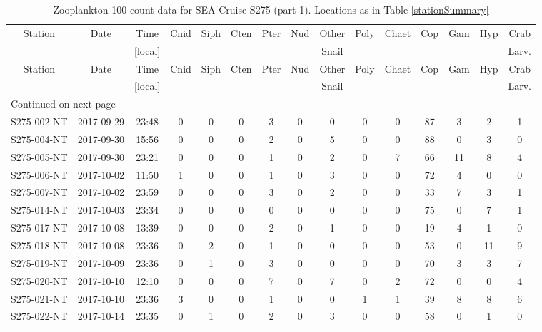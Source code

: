 \begin{longtable}{ccccccccccccccc}
\caption{\label{100count1} Zooplankton 100 count data for SEA Cruise S275 (part 1). Locations as in Table \ref{stationSummary}} \\ 
 Station & Date & Time & Cnid & Siph & Cten & Pter & Nud & Other & Poly & Chaet & Cop & Gam & Hyp & Crab \\ 
   &  & [local] &  &  &  &  &  & Snail &  &  &  &  &  & Larv. \\ 
\hline\n\endfirsthead
Station & Date & Time & Cnid & Siph & Cten & Pter & Nud & Other & Poly & Chaet & Cop & Gam & Hyp & Crab \\ 
 &  & [local] &  &  &  &  &  & Snail &  &  &  &  &  & Larv. \\ 
\hline
\endhead
\hline
\multicolumn{15}{l}{\footnotesize Continued on next page}
\endfoot
\endlastfoot
 \hline
S275-001-NT & 2017-09-29 & 12:34 & 0 & 0 & 0 & 0 & 0 & 0 & 0 & 0 & 1 & 0 & 0 & 0 \\ 
  S275-002-NT & 2017-09-29 & 23:48 & 0 & 0 & 0 & 3 & 0 & 0 & 0 & 0 & 87 & 3 & 2 & 1 \\ 
  S275-004-NT & 2017-09-30 & 15:56 & 0 & 0 & 0 & 2 & 0 & 5 & 0 & 0 & 88 & 0 & 3 & 0 \\ 
  S275-005-NT & 2017-09-30 & 23:21 & 0 & 0 & 0 & 1 & 0 & 2 & 0 & 7 & 66 & 11 & 8 & 4 \\ 
  S275-006-NT & 2017-10-02 & 11:50 & 1 & 0 & 0 & 1 & 0 & 3 & 0 & 0 & 72 & 4 & 0 & 0 \\ 
  S275-007-NT & 2017-10-02 & 23:59 & 0 & 0 & 0 & 3 & 0 & 2 & 0 & 0 & 33 & 7 & 3 & 1 \\ 
  S275-014-NT & 2017-10-03 & 23:34 & 0 & 0 & 0 & 0 & 0 & 0 & 0 & 0 & 75 & 0 & 7 & 1 \\ 
  S275-017-NT & 2017-10-08 & 13:39 & 0 & 0 & 0 & 2 & 0 & 1 & 0 & 0 & 19 & 4 & 1 & 0 \\ 
  S275-018-NT & 2017-10-08 & 23:36 & 0 & 2 & 0 & 1 & 0 & 0 & 0 & 0 & 53 & 0 & 11 & 9 \\ 
  S275-019-NT & 2017-10-09 & 23:36 & 0 & 1 & 0 & 3 & 0 & 0 & 0 & 0 & 70 & 3 & 3 & 7 \\ 
  S275-020-NT & 2017-10-10 & 12:10 & 0 & 0 & 0 & 7 & 0 & 7 & 0 & 2 & 72 & 0 & 0 & 4 \\ 
  S275-021-NT & 2017-10-10 & 23:36 & 3 & 0 & 0 & 1 & 0 & 0 & 1 & 1 & 39 & 8 & 8 & 6 \\ 
  S275-022-NT & 2017-10-14 & 23:35 & 0 & 1 & 0 & 2 & 0 & 3 & 0 & 0 & 58 & 0 & 1 & 0 \\ 

\end{longtable}
